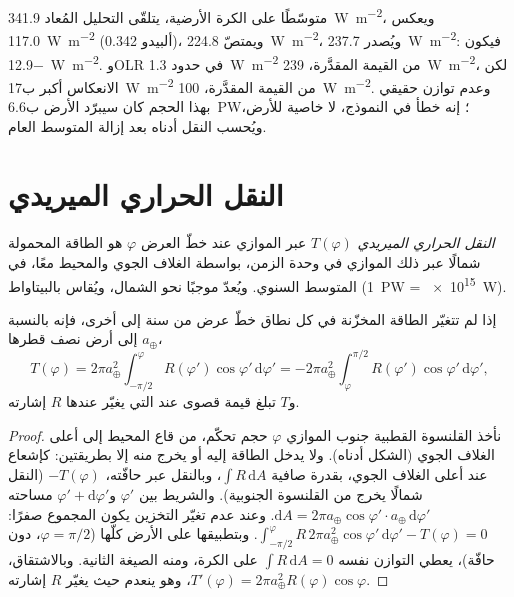 \begin{example}\label{ex:b1:radiation-heat-transport:global}
متوسّطًا على الكرة الأرضية، يتلقّى التحليل المُعاد \qty{341.9}{W.m^{-2}}، ويعكس \qty{117.0}{W.m^{-2}} (ألبيدو \num{0.342})، ويمتصّ \qty{224.8}{W.m^{-2}}، ويُصدر \qty{237.7}{W.m^{-2}}: فيكون  \qty{-12.9}{W.m^{-2}}. وOLR في حدود \qty{1.3}{W.m^{-2}} من القيمة المقدَّرة، \qty{239}{W.m^{-2}}، لكن الانعكاس أكبر ب\qty{17}{W.m^{-2}} من القيمة المقدَّرة، \qty{100}{W.m^{-2}}. وعدم توازن حقيقي بهذا الحجم كان سيبرّد الأرض ب\qty{6.6}{PW}؛ إنه خطأ في النموذج، لا خاصية للأرض، ويُحسب النقل أدناه بعد إزالة المتوسط العام.
\end{example}

\section{النقل الحراري الميريدي}\label{sec:b1:radiation-heat-transport:transport}

\begin{definition}\label{def:b1:radiation-heat-transport:mht}
\emph{النقل الحراري الميريدي} $T(\varphi)$
عبر الموازي عند خطّ العرض $\varphi$ هو الطاقة المحمولة شمالًا عبر ذلك الموازي في وحدة الزمن، بواسطة الغلاف الجوي والمحيط معًا، في المتوسط السنوي. ويُعدّ موجبًا نحو الشمال، ويُقاس بالبيتاواط (\qty{1}{PW} = \qty{e15}{W}).
\end{definition}

\begin{proposition}\label{prop:b1:radiation-heat-transport:mht}
إذا لم تتغيّر الطاقة المخزّنة في كل نطاق خطّ عرض من سنة إلى أخرى، فإنه بالنسبة إلى أرض نصف قطرها $a_\oplus$،
\[
  T(\varphi) = 2\pi a_\oplus^2\int_{-\pi/2}^{\varphi} R(\varphi')\cos\varphi'\,
  \mathrm d\varphi' = -2\pi a_\oplus^2\int_{\varphi}^{\pi/2} R(\varphi')\cos
  \varphi'\,\mathrm d\varphi' ,
\]
و$T$ تبلغ قيمة قصوى عند  التي يغيّر عندها $R$ إشارته.
\end{proposition}

\begin{proof}
نأخذ القلنسوة القطبية جنوب الموازي $\varphi$ حجم تحكّم، من قاع المحيط إلى أعلى الغلاف الجوي (الشكل أدناه). ولا يدخل الطاقة إليه أو يخرج منه إلا بطريقتين: كإشعاع عند أعلى الغلاف الجوي، بقدرة صافية $\int R\,\mathrm dA$، وبالنقل عبر حافّته، $-T(\varphi)$ (النقل شمالًا يخرج من القلنسوة الجنوبية). والشريط بين $\varphi'$ و$\varphi' + \mathrm d\varphi'$ مساحته $\mathrm dA = 2\pi a_\oplus\cos\varphi'
\cdot a_\oplus\,\mathrm d\varphi'$. وعند عدم تغيّر التخزين يكون المجموع صفرًا:
$\int_{-\pi/2}^{\varphi} R\,2\pi a_\oplus^2\cos\varphi'\,\mathrm d\varphi' -
T(\varphi) = 0$. وبتطبيقها على الأرض كلّها ($\varphi = \pi/2$، دون حافّة)، يعطي التوازن نفسه $\int R\,\mathrm dA = 0$ على الكرة، ومنه الصيغة الثانية. وبالاشتقاق، $T'(\varphi) = 2\pi a_\oplus^2 R(\varphi)\cos\varphi$، وهو ينعدم حيث يغيّر $R$ إشارته.
\end{proof}


